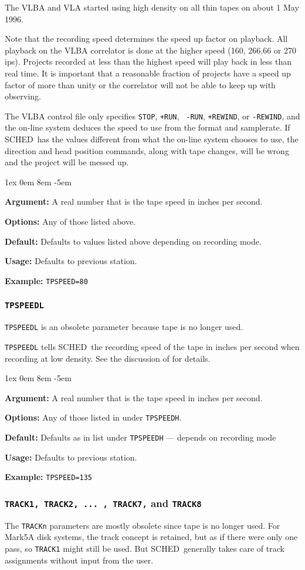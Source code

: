 \documentclass{report}
\newcommand{\schedb}{{\sc SCHED~}}
\newcommand{\rcwbox}[5]{
  \begin{list}{}{\parsep 1ex  \itemsep 0em
                 \leftmargin 8em  \itemindent -5em }
    \item {\bf Argument:} #1
    \item {\bf Options:}  #2
    \item {\bf Default:}  #3
    \item {\bf Usage:}    #4
    \item {\bf Example:}  #5
  \end{list}
}
\begin{document}
The VLBA and VLA started using high density on all thin tapes on
about 1 May 1996.

Note that the recording speed determines the speed up factor on
playback.  All playback on the VLBA correlator is done at the higher
speed (160, 266.66 or 270 ips).  Projects recorded at less than the
highest speed will play back in less than real time.  It is important
that a reasonable fraction of projects have a speed up factor of more
than unity or the correlator will not be able to keep up with
observing.

The VLBA control file only specifies {\tt STOP}, {\tt +RUN}, {\tt
-RUN}, {\tt +REWIND}, or {\tt -REWIND}, and the on-line system deduces
the speed to use from the format and samplerate.  If \schedb has
the values different from what the on-line system chooses to use, the
direction and head position commands, along with tape changes, will be
wrong and the project will be messed up.


\rcwbox
{A real number that is the tape speed in inches per second.}
{Any of those listed above.}
{Defaults to values listed above depending on recording mode.}
{Defaults to previous station.}
{{\tt TPSPEED=80}}

\subsubsection{\label{SP:TPSPEEDL}{\tt TPSPEEDL}}

{\tt TPSPEEDL} is an obsolete parameter because tape is no longer used.

{\tt TPSPEEDL} tells \schedb the recording speed of the tape in inches
per second when recording at low density.  See the discussion of
 for details.

\rcwbox
{A real number that is the tape speed in inches per second.}
{Any of those listed in under {\tt TPSPEEDH}.}
{Defaults as in list under {\tt TPSPEEDH} --- depends on recording
mode}
{Defaults to previous station.}
{{\tt TPSPEED=135}}


\subsubsection{\label{SP:TRACK1}
{\tt TRACK1, TRACK2, ... , TRACK7,} and {\tt TRACK8}}

The {\tt TRACKn} parameters are mostly obsolete since tape is no
longer used.  For Mark5A disk systems, the track concept is retained,
but as if there were only one pass, so {\tt TRACK1} might still be
used.  But \schedb generally takes care of track assignments without
input from the user.
\end{document}
